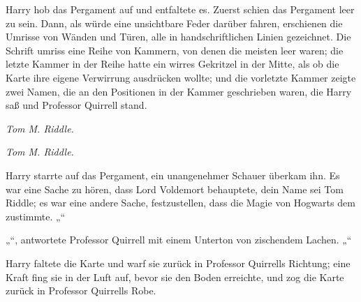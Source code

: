 Harry hob das Pergament auf und entfaltete es.
%
Zuerst schien das Pergament leer zu sein. Dann, als würde eine unsichtbare Feder darüber fahren, erschienen die Umrisse von Wänden und Türen, alle in handschriftlichen Linien gezeichnet. Die Schrift umriss eine Reihe von Kammern, von denen die meisten leer waren; die letzte Kammer in der Reihe hatte ein wirres Gekritzel in der Mitte, als ob die Karte ihre eigene Verwirrung ausdrücken wollte; und die vorletzte Kammer zeigte zwei Namen, die an den Positionen in der Kammer geschrieben waren, die Harry saß und Professor Quirrell stand.

\emph{Tom M. Riddle.}

\emph{Tom M. Riddle.}

Harry starrte auf das Pergament, ein unangenehmer Schauer überkam ihn. Es war eine Sache zu hören, dass Lord Voldemort behauptete, dein Name sei Tom Riddle; es war eine andere Sache, festzustellen, dass die Magie von Hogwarts dem zustimmte.
„“

„“, antwortete Professor Quirrell mit einem Unterton von zischendem Lachen. „“

Harry faltete die Karte und warf sie zurück in Professor Quirrells Richtung; eine Kraft fing sie in der Luft auf, bevor sie den Boden erreichte, und zog die Karte zurück in Professor Quirrells Robe.

